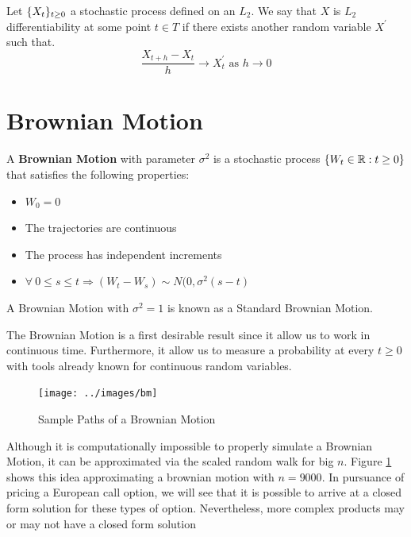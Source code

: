 \documentclass[../TGMAFFIRO]{subfiles}
\begin{document}
\begin{definition}[$L_2$ differentiability]
Let $\{X_t\}_{t\geq 0}$ a stochastic process defined on an $L_2$. We say that $X$ is $L_2$ differentiability at some point $t\in T$ if there exists another random variable $X^\prime$ such that.
\begin{equation}
	\frac{X_{t+h}- X_t}{h} \to X^\prime_t \text{ as } h\to 0
\end{equation}
\end{definition}

\section{Brownian Motion}
\begin{definition}\label{def:brownian_motion}
	A \textbf{Brownian Motion} with parameter $\sigma^2$ is a stochastic process $\{W_t \in \mathbb{R}:t\geq 0\}$ that satisfies the following properties:
	\begin{itemize}
		\item $W_0 = 0$
		\item The trajectories are continuous
		\item The process has independent increments
		\item $\forall \ 0 \leq s \leq t \Longrightarrow (W_t - W_s) \sim N(0, \sigma^2(s - t)$
	\end{itemize}
\end{definition}

\begin{remark}
	A Brownian Motion with $\sigma^2 = 1$ is known as a Standard Brownian Motion.
\end{remark}

The Brownian Motion is a first desirable result since it allow us to work in continuous time. Furthermore, it allow us to measure a probability at every $t\geq 0$ with tools already known for continuous random variables. 

\begin{figure}[h]
	\centering
	\label{fig:Brownian_Motion}
	\texttt{[image: ../images/bm]}
	\caption{Sample Paths of a Brownian Motion}
\end{figure}

Although it is computationally impossible to properly simulate a Brownian Motion, it can be approximated via the scaled random walk for big $n$. Figure \ref{fig:Brownian_Motion} shows this idea approximating a brownian motion with $n=9000$. In pursuance of pricing a European call option, we will see that it is possible to arrive at a closed form solution for these types of option. Nevertheless, more complex products may or may not have a closed form solution\\
\end{document}
